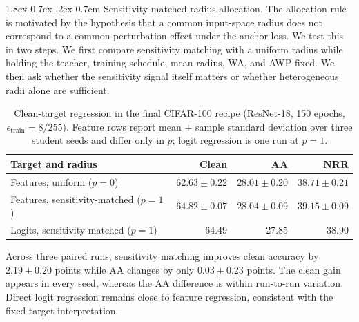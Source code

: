 \documentclass{article} %
\makeatletter
\theoremstyle{plain}
\renewcommand{\paragraph}{\@startsection{paragraph}{4}{\z@}%
  {1.8ex \@plus 0.7ex \@minus .2ex}{-0.7em}%
  {\normalfont\normalsize\bfseries}}
\makeatother
\begin{document}
\paragraph{Sensitivity-matched radius allocation.}
The allocation rule is motivated by the hypothesis that a common input-space
radius does not correspond to a common perturbation effect under the anchor
loss. We test this in two steps. We first compare sensitivity matching with a
uniform radius while holding the teacher, training schedule, mean radius, WA,
and AWP fixed. We then ask whether the sensitivity signal itself matters or
whether heterogeneous radii alone are sufficient.
\begin{table}[!htbp]
  \centering
  \small
  \setlength{\tabcolsep}{5pt}
  \caption{
  Clean-target regression in the final CIFAR-100 recipe
  (ResNet-18, 150 epochs, \(\epsilon_{\mathrm{train}}=8/255\)).
  Feature rows report mean \(\pm\) sample standard deviation over three
  student seeds and differ only in \(p\); logit regression is one run at
  \(p=1\).
  }
  \label{tab:finalallocation}
  \begin{tabular}{lrrr}
    \toprule
    Target and radius & Clean & AA & NRR \\
    \midrule
    Features, uniform (\(p=0\))
      & \(62.63\pm0.22\)
      & \(28.01\pm0.20\)
      & \(38.71\pm0.21\) \\
    Features, sensitivity-matched (\(p=1\))
      & \(\mathbf{64.82\pm0.07}\)
      & \(\mathbf{28.04\pm0.09}\)
      & \(\mathbf{39.15\pm0.09}\) \\
    Logits, sensitivity-matched (\(p=1\))
      & 64.49 & 27.85 & 38.90 \\
    \bottomrule
  \end{tabular}
\end{table}

Across three paired runs, sensitivity matching improves clean accuracy by
\(2.19\pm0.20\) points while AA changes by only \(0.03\pm0.23\) points. The
clean gain appears in every seed, whereas the AA difference is within
run-to-run variation. Direct logit regression remains close to feature
regression, consistent with the fixed-target interpretation.
\end{document}
